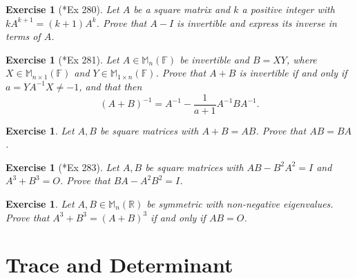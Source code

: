 \documentclass[12pt]{article}
\theoremstyle{breakplain}
\theoremstyle{breakdef}
\newtheorem{ex}[subsubsection]{Exercise}
\theoremstyle{remark}
\begin{document}
\begin{ex}[\cite{GA17}*{Ex 280}]
    Let $A$ be a square matrix and $ k $ a positive integer with $ kA^{k+1}=(k+1)A^k $. Prove that $ A-I $ is invertible and express its inverse in terms of $A$.
\end{ex}
\begin{ex}[\cite{GA17}*{Ex 281}]
    Let $ A\in\mathbb{M}_n(\mathbb{F}) $ be invertible and $ B=XY $, where $X\in\mathbb{M}_{n\times1}(\mathbb{F})$ and $Y\in\mathbb{M}_{1\times n}(\mathbb{F})$. Prove that $A+B$ is invertible if and only if $a=YA^{-1}X\neq -1$, and that then
    \[(A+B)^{-1}=A^{-1}-\frac{1}{a+1}A^{-1}BA^{-1}.\]
\end{ex}
\begin{ex}
    Let $A,B$ be square matrices with $A+B=AB$. Prove that $AB=BA$.
\end{ex}
\begin{ex}[\cite{GA17}*{Ex 283}]
    Let $A,B$ be square matrices with $ AB-B^2A^2=I $ and $ A^3+B^3=O $. Prove that $ BA-A^2B^2=I $.
\end{ex}
\begin{ex}
    Let $A,B\in \mathbb{M}_n(\mathbb{R})$ be symmetric with non-negative eigenvalues. Prove that $A^3+B^3=(A+B)^3$ if and only if $AB=O$.
\end{ex}

\newpage
\section{Trace and Determinant}
\end{document}
